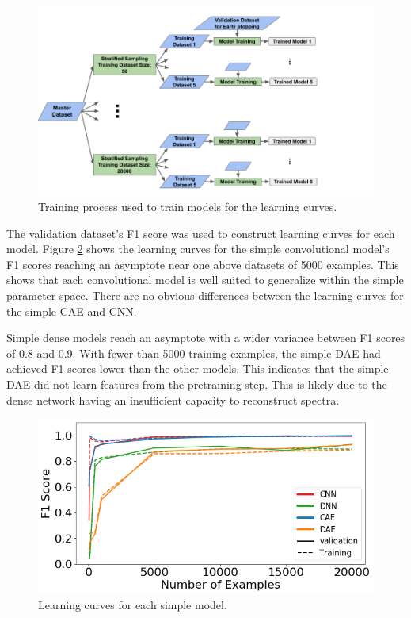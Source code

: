 \begin{figure}[H]
	\centering
	\includegraphics[trim=0 0 0 0,clip,width=1.0\linewidth]{images/learning_curve_training_diagram}
	\caption{Training process used to train models for the learning curves.}
	\label{fig:learning_curve_training_diagram}
\end{figure}

The validation dataset's F1 score was used to construct learning curves for each model. Figure \ref{fig:learning_curves_easy} shows the learning curves for the simple convolutional model's F1 scores reaching an asymptote near one above datasets of 5000 examples. This shows that each convolutional model is well suited to generalize within the simple parameter space. There are no obvious differences between the learning curves for the simple CAE and CNN.

Simple dense models reach an asymptote with a wider variance between F1 scores of 0.8 and 0.9. With fewer than 5000 training examples, the simple DAE had achieved F1 scores lower than the other models. This indicates that the simple DAE did not learn features from the pretraining step. This is likely due to the dense network having an insufficient capacity to reconstruct spectra.


\begin{figure}[H]
	\centering
	\includegraphics[width=0.9\linewidth]{images/learning_curves_easy}
	\caption{Learning curves for each simple model.}
	\label{fig:learning_curves_easy}
\end{figure}

